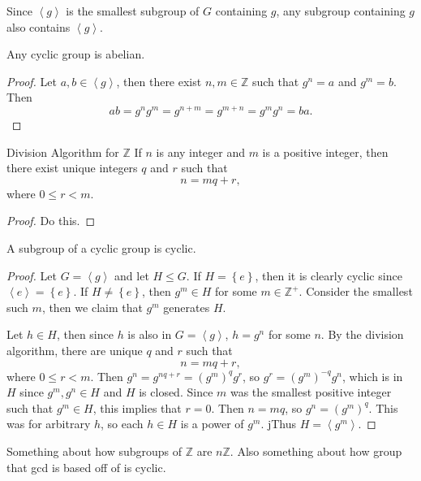 \documentclass[10pt]{report}
\begin{document}
\begin{note}{}{}
Since $\left\langle g \right\rangle$ is the smallest subgroup of $G$ containing $g$, any subgroup containing $g$ also contains $\left\langle g \right\rangle$.
\end{note}

\begin{prop}
	Any cyclic group is abelian.
\end{prop}
\begin{proof}
	Let $a,b \in \left\langle g \right\rangle$, then there exist $n,m \in \mathbb{Z}$ such that $g^n=a$ and $g^m=b$. Then
	\[
	ab = g^n g^m = g^{n+m}=g^{m+n}=g^m g^n=ba.
	\] 
\end{proof}

\begin{thrm}{Division Algorithm for $\mathbb{Z}$}{}
If $n$ is any integer and $m$ is a positive integer, then there exist unique integers $q$ and $r$ such that
\[
n = mq + r,
\] where $0 \leq r < m.$
\end{thrm}
\begin{proof}
	{\color{red}Do this.}
\end{proof}

\begin{prop}
	A subgroup of a cyclic group is cyclic.
\end{prop}
\begin{proof}
	Let $G = \left\langle g \right\rangle$ and let $H \leq G$. If $H = \left\{ e \right\}$, then it is clearly cyclic since $\left\langle e \right\rangle = \left\{ e \right\}$. If $H \neq \left\{ e \right\}$, then $g^{m}\in H$ for some $m \in \mathbb{Z}^+$. Consider the smallest such $m$, then we claim that $g^m$ generates $H$.

	Let $h \in H$, then since $h$ is also in $G = \left\langle g \right\rangle$, $h = g^n$ for some $n$. By the division algorithm, there are unique $q$ and $r$ such that
	\[
	n = mq+r,
\] where $0 \leq r < m$. Then $g^n = g^{nq+r}= (g^m)^q g^r$, so $g^r = (g^m)^{-q}g^n$, which is in $H$ since $g^m, g^n \in H$ and $H$ is closed. Since $m$ was the smallest positive integer such that $g^m \in H$, this implies that $r=0$. Then $n=mq$, so $g^n = (g^m)^q$. This was for arbitrary $h$, so each $h \in H$ is a power of $g^m$. jThus $H = \left\langle g^m \right\rangle$.
\end{proof}

{\color{red}Something about how subgroups of $\mathbb{Z}$ are $n\mathbb{Z}$. Also something about how group that gcd is based off of is cyclic.}
\end{document}
